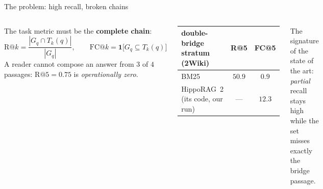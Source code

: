 \documentclass[aspectratio=169,10pt]{beamer}
\newcommand{\hippo}{HippoRAG~2}
\newcommand{\bad}[1]{\textcolor{teja}{\textbf{#1}}}
\begin{document}
\begin{frame}{The problem: high recall, broken chains}
\begin{columns}[T]
The task metric must be the \textbf{complete chain}:
\[
\mathrm{R@}k=\frac{|G_q\cap T_k(q)|}{|G_q|},\qquad
\mathrm{FC@}k=\mathbf 1\bigl[G_q\subseteq T_k(q)\bigr]
\]
A reader cannot compose an answer from $3$ of $4$ passages:
$\mathrm{R@}5=0.75$ is \emph{operationally zero}.
\vspace{1mm}
\begin{center}\small
\begin{tabular}{lcc}
\toprule
double-bridge stratum (2Wiki) & R@5 & FC@5\\
\midrule
BM25 & $50.9$ & \bad{$0.9$}\\
\hippo{} (its code, our run) & --- & \bad{$12.3$}\\
\bottomrule
\end{tabular}
\end{center}
\centering
{}

\vspace{2mm}
\scriptsize The signature of the state of the art: \emph{partial} recall
stays high while the set misses exactly the bridge passage.
\end{columns}
\end{frame}
\end{document}
